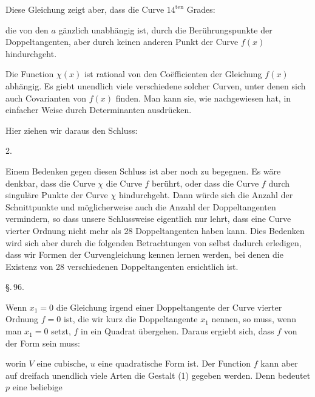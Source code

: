 Diese Gleichung zeigt aber, dass die Curve $14^{\text{ten}}$ Grades:


die von den $a$ gänzlich unabhängig ist, durch die Berührungspunkte der Doppeltangenten, aber durch keinen anderen Punkt der Curve $f(x)$ hindurchgeht.

Die Function $\chi(x)$ ist rational von den Coëfficienten der Gleichung $f(x)$ abhängig. Es giebt unendlich viele verschiedene solcher Curven, unter denen sich auch Covarianten von $f(x)$ finden. Man kann sie, wie  nachgewiesen hat, in einfacher Weise durch Determinanten ausdrücken.

Hier ziehen wir daraus den Schluss:

2.\ 

Einem Bedenken gegen diesen Schluss ist aber noch zu begegnen. Es wäre denkbar, dass die Curve $\chi$ die Curve $f$ berührt, oder dass die Curve $f$ durch singuläre Punkte der Curve $\chi$ hindurchgeht. Dann würde sich die Anzahl der Schnittpunkte und möglicherweise auch die Anzahl der Doppeltangenten vermindern, so dass unsere Schlussweise eigentlich nur lehrt, dass eine Curve vierter Ordnung nicht mehr als 28 Doppeltangenten haben kann. Dies Bedenken wird sich aber durch die folgenden Betrachtungen von selbst dadurch erledigen, dass wir Formen der Curvengleichung kennen lernen werden, bei denen die Existenz von 28 verschiedenen Doppeltangenten ersichtlich ist.

\begin{center}
\S.\,96.

\end{center}

Wenn $x_1 = 0$ die Gleichung irgend einer Doppeltangente der Curve vierter Ordnung $f = 0$ ist, die wir kurz die Doppeltangente $x_1$ nennen, so muss, wenn man $x_1 = 0$ setzt, $f$ in ein Quadrat übergehen. Daraus ergiebt sich, dass $f$ von der Form sein muss:


worin $V$ eine cubische, $u$ eine quadratische Form ist. Der Function $f$ kann aber auf dreifach unendlich viele Arten die Gestalt (1) gegeben werden. Denn bedeutet $p$ eine beliebige
